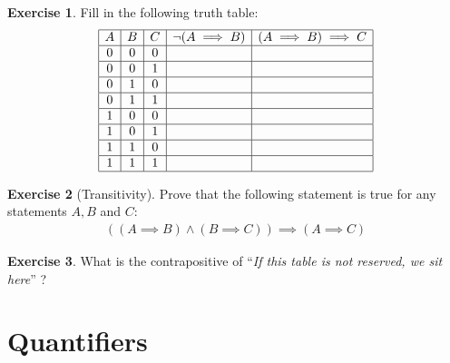 \documentclass[a4paper,oneside]{article}
\theoremstyle{definition} \newtheorem{exercise}{Exercise}[section]
\begin{document}
\begin{exercise}
  Fill in the following truth table:
  \begin{align*}
    \begin{array}{|c|c|c|c|c|}
      \hline
      A & B & C & \neg(A\implies B) & (A\implies B) \implies C \\
      \hline
      0 & 0 & 0 & & \\
      \hline
      0 & 0 & 1 & & \\
      \hline
      0 & 1 & 0 & & \\
      \hline
      0 & 1 & 1 & & \\
      \hline
      1 & 0 & 0 & & \\
      \hline
      1 & 0 & 1 & & \\
      \hline
      1 & 1 & 0 & & \\
      \hline
      1 & 1 & 1 & & \\
      \hline
    \end{array}
  \end{align*}
\end{exercise}

\begin{exercise}[Transitivity]
  Prove that the following statement is true for any statements $A,B$ and $C$:
  \begin{align*}
    ((A\implies B)\land (B\implies C))\implies (A\implies C)
  \end{align*}
\end{exercise}

\begin{exercise}
What is the contrapositive of ``\emph{If this table is not reserved, we sit
here}'' ?
\end{exercise}

\section{Quantifiers}
\end{document}

